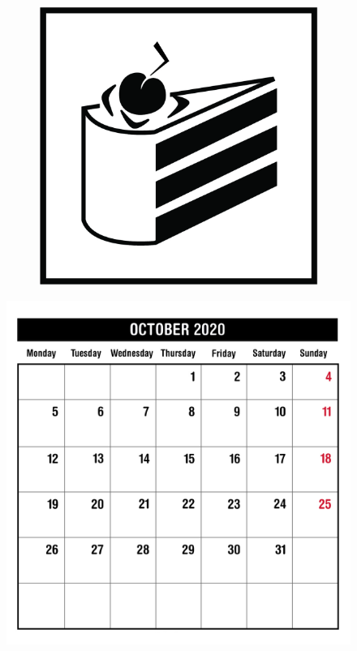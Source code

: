 \begin{figure}[H]
\begin{subfigure}[l]{0.195\linewidth}
  \end{subfigure}
  \begin{subfigure}[l]{0.195\linewidth}
    \includegraphics[width=\textwidth]{Sources/PortalIcons/10.jpg}
  \end{subfigure}
\end{figure}


\newpage
\begin{figure}[H]
    \includegraphics[width=\textwidth]{Sources/MonthViews/October20.jpg}
\end{figure}

